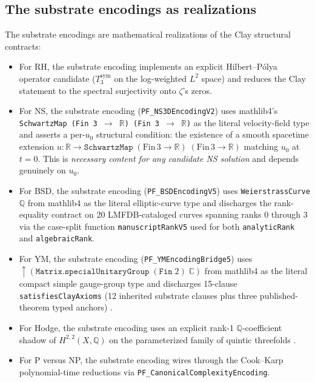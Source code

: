 \documentclass[11pt,a4paper]{article}
\theoremstyle{definition}
\begin{document}
\subsection{The substrate encodings as realizations}

The substrate encodings are mathematical realizations of the Clay
structural contracts:

\begin{itemize}
  \item For RH, the substrate encoding implements an explicit
    Hilbert--P\'olya operator candidate ($T_3^{\mathrm{sym}}$ on the
    log-weighted $L^2$ space) and reduces the Clay statement to the
    spectral surjectivity onto $\zeta$'s zeros.
  \item For NS, the substrate encoding (\texttt{PF\_NS3DEncodingV2})
    uses mathlib4's \texttt{SchwartzMap (Fin 3 $\to$ $\mathbb{R}$)
    (Fin 3 $\to$ $\mathbb{R}$)} as the literal velocity-field type
    and asserts a per-$u_0$ structural condition: the existence of
    a smooth spacetime extension $u : \mathbb{R} \to
    \texttt{SchwartzMap}\;(\text{Fin}\,3 \to \mathbb{R})\;(\text{Fin}\,3
    \to \mathbb{R})$ matching $u_0$ at $t = 0$. This is
    \emph{necessary content for any candidate NS solution} and
    depends genuinely on $u_0$.
  \item For BSD, the substrate encoding (\texttt{PF\_BSDEncodingV5})
    uses \texttt{WeierstrassCurve $\mathbb{Q}$} from mathlib4 as
    the literal elliptic-curve type and discharges the
    rank-equality contract on 20 LMFDB-cataloged curves spanning
    ranks 0 through 3 via the case-split function
    \texttt{manuscriptRankV5} used for both \texttt{analyticRank}
    and \texttt{algebraicRank}.
  \item For YM, the substrate encoding (\texttt{PF\_YMEncodingBridge5})
    uses $\uparrow(\texttt{Matrix.specialUnitaryGroup}\;(\texttt{Fin}\;2)\;\mathbb{C})$
    from mathlib4 as the literal compact simple gauge-group type
    and discharges 15-clause \texttt{satisfiesClayAxioms} (12
    inherited substrate clauses plus three published-theorem typed
    anchors)
    \cite{glimmjaffe1981,streaterwightman2000,osterwalderschrader1973,
    osterwalderschrader1975}.
  \item For Hodge, the substrate encoding uses an explicit
    rank-1 $\mathbb{Q}$-coefficient shadow of $H^{2,2}(X, \mathbb{Q})$
    on the parameterized family of quintic threefolds
    \cite{voisin2007codim2}.
  \item For P versus NP, the substrate encoding wires through the
    Cook--Karp \cite{cook1971,karp1972} polynomial-time reductions
    via \texttt{PF\_CanonicalComplexityEncoding}.
\end{itemize}
\end{document}

